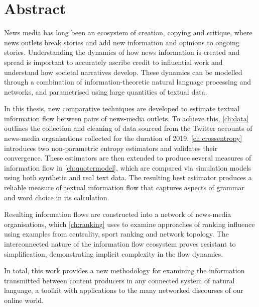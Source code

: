 \chapter{Abstract}
\label{ch:abstract}

News media has long been an ecosystem of creation, copying and critique, where news outlets break stories and add new information and opinions to ongoing stories. Understanding the dynamics of how news information is created and spread is important to accurately ascribe credit to influential work and understand how societal narratives develop. 
These dynamics can be modelled through a combination of information-theoretic natural language processing and networks, and parametrised using large quantities of textual data. 

In this thesis, new comparative techniques are developed to estimate textual information flow between pairs of news-media outlets. To achieve this, \autoref{ch:data} outlines the collection and cleaning of data sourced from the Twitter accounts of news-media organisations collected for the duration of 2019. \autoref{ch:crossentropy} introduces two non-parametric entropy estimators and validates their convergence. These estimators are then extended to produce several measures of information flow in \autoref{ch:quotermodel}, which are compared via simulation models using both synthetic and real text data. The resulting best estimator produces a reliable measure of textual information flow that captures aspects of grammar and word choice in its calculation. 

Resulting information flows are constructed into a network of news-media organisations, which \autoref{ch:ranking} uses to examine approaches of ranking influence using examples from centrality, sport ranking and network topology. The interconnected nature of the information flow ecosystem proves resistant to simplification, demonstrating implicit complexity in the flow dynamics.

In total, this work provides a new methodology for examining the information transmitted between content producers in any connected system of natural language, a toolkit with applications to the many networked discourses of our online world. 




